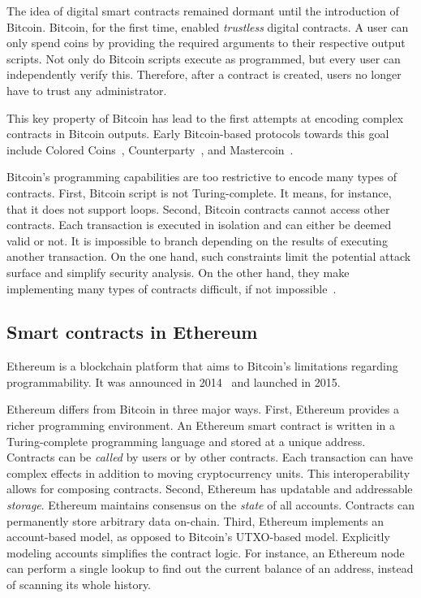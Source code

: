 The idea of digital smart contracts remained dormant until the introduction of Bitcoin.
Bitcoin, for the first time, enabled \textit{trustless} digital contracts.
A user can only spend coins by providing the required arguments to their respective output scripts.
Not only do Bitcoin scripts execute as programmed, but every user can independently verify this.
Therefore, after a contract is created, users no longer have to trust any administrator.

This key property of Bitcoin has lead to the first attempts at encoding complex contracts in Bitcoin outputs.
Early Bitcoin-based protocols towards this goal include Colored Coins~\cite{Rosenfeld2012}, Counterparty~\cite{Counterparty, Bartoletti2017a}, and Mastercoin~\cite{Willett2016}.

Bitcoin's programming capabilities are too restrictive to encode many types of contracts.
First, Bitcoin script is not Turing-complete.
It means, for instance, that it does not support loops.
Second, Bitcoin contracts cannot access other contracts.
Each transaction is executed in isolation and can either be deemed valid or not.
It is impossible to branch depending on the results of executing another transaction.
On the one hand, such constraints limit the potential attack surface and simplify security analysis.
On the other hand, they make implementing many types of contracts difficult, if not impossible~\cite{Miller2019}.


\subsection{Smart contracts in Ethereum}

Ethereum is a blockchain platform that aims to Bitcoin's limitations regarding programmability.
It was announced in 2014~\cite{Buterin2014, Wood2014} and launched in 2015.

Ethereum differs from Bitcoin in three major ways.
First, Ethereum provides a richer programming environment.
An Ethereum smart contract is written in a Turing-complete programming language and stored at a unique address.
Contracts can be \textit{called} by users or by other contracts.
Each transaction can have complex effects in addition to moving cryptocurrency units.
This interoperability allows for composing contracts.
Second, Ethereum has updatable and addressable \textit{storage}.
Ethereum maintains consensus on the \textit{state} of all accounts.
Contracts can permanently store arbitrary data on-chain.
Third, Ethereum implements an account-based model, as opposed to Bitcoin's UTXO-based model.
Explicitly modeling accounts simplifies the contract logic.
For instance, an Ethereum node can perform a single lookup to find out the current balance of an address, instead of scanning its whole history.


